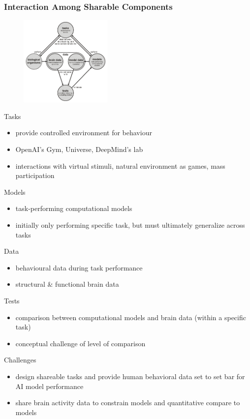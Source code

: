 \documentclass[
t, %
10pt, %
aspectratio=1610, %
ngerman,
english,
]{beamer}
\begin{document}
\begin{frame}
    \frametitle{Interaction Among Sharable Components}
    \begin{figure}
     \includegraphics[width=0.4\textwidth]{figures/figure4}
    \end{figure}
    Tasks
    \begin{itemize}
     \item provide controlled environment for behaviour
     \item OpenAI's Gym, Universe, DeepMind's lab
     \item interactions with virtual stimuli, natural environment as games, mass participation
    \end{itemize}
    Models
    \begin{itemize}
     \item task-performing computational models
     \item initially only performing specific task, but must ultimately generalize across tasks 
    \end{itemize}
    Data
    \begin{itemize}
     \item behavioural data during task performance
     \item structural \& functional brain data
    \end{itemize}
    Tests
    \begin{itemize}
     \item comparison between computational models and brain data (within a specific task)
     \item conceptual challenge of level of comparison
    \end{itemize}
    Challenges
    \begin{itemize}
     \item design shareable tasks and provide human behavioral data set to set bar for AI model performance
     \item share brain activity data to constrain models and quantitative compare to models
    \end{itemize}
\end{frame}
\end{document}
